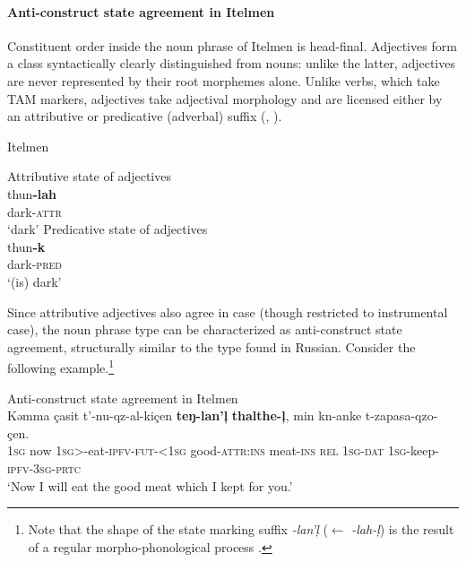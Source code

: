 \paragraph*{Anti\hyp{}construct state agreement in Itelmen}
\label{itelmen synchr}
Constituent order inside the noun phrase of Itelmen is head-final. Adjectives form a class syntactically clearly distinguished from nouns: unlike the latter, adjectives are never represented by their root morphemes alone. Unlike verbs, which take TAM markers, adjectives take adjectival morphology and are licensed either by an attributive or predicative (adverbal) suffix (\citealt{volodin1997}, \citealt[54]{georg-etal1999}).
\begin{exe}
\ex \label{itelmen ex}
\rm{Itelmen \citep{volodin1997}} 
\begin{xlist}
\ex \rm{Attributive state of adjectives}\\
\gll	thun\textbf{-lah}\\
	dark-\textsc{attr}\\
\glt	‘dark’
\ex \rm{Predicative state of adjectives}\\
\gll	thun\textbf{-k}\\
	dark-\textsc{pred}\\
\glt	‘(is) dark’
\end{xlist}
\end{exe}
Since attributive adjectives also agree in case (though restricted to instrumental case), the noun phrase type can be characterized as anti\hyp{}construct state agreement, structurally similar to the type found in Russian. Consider the following example.\footnote{Note that the shape of the state marking suffix \textit{-lan'ļ} ($\leftarrow$ \textit{-lah-ļ}) is the result of a regular morpho-phonological process \citep{georg-etal1999}.}
\begin{exe}
\ex \rm{Anti\hyp{}construct state agreement in Itelmen \citep{georg-etal1999}}\\
\gll	Kəmma çasit t'-nu-qz-al-kiçen \textbf{teŋ-lan'ļ} \textbf{thalthe-ļ}, min kn-anke t-zapasa-qzo-çen.\\
	\textsc{1sg} now \textsc{1sg}>-eat-\textsc{ipfv-fut-<1sg} good-\textsc{attr:ins} meat-\textsc{ins} \textsc{rel} \textsc{1sg-dat} \textsc{1sg}-keep-\textsc{ipfv-3sg-prtc}\\
\glt	‘Now I will eat the good meat which I kept for you.’
\end{exe}


